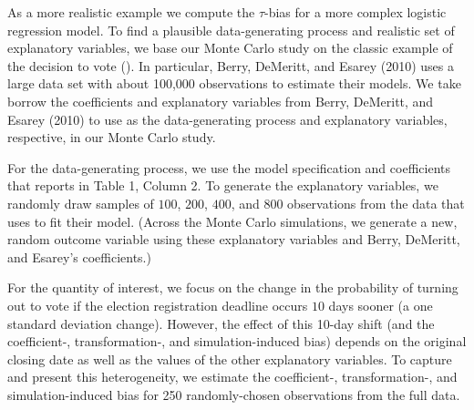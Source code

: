 \documentclass[11pt]{article}
\begin{document}
As a more realistic example we compute the $\tau$-bias for a more complex logistic regression model.
To find a plausible data-generating process and realistic set of explanatory variables, we base our Monte Carlo study on the classic example of the decision to vote (\citealt{WolfingerRosenstone1980, Nagler1994, HuangShields2000, BerryDeMerittEsarey2010}).
In particular, Berry, DeMeritt, and Esarey (2010) uses a large data set with about 100,000 observations to estimate their models.
We take borrow the coefficients and explanatory variables from Berry, DeMeritt, and Esarey (2010) to use as the data-generating process and explanatory variables, respective, in our Monte Carlo study.

For the data-generating process, we use the model specification and coefficients that \cite{BerryDeMerittEsarey2010} reports in Table 1, Column 2.
To generate the explanatory variables, we randomly draw samples of $100$, $200$, $400$, and $800$ observations from the data that \cite{BerryDeMerittEsarey2010} uses to fit their model.
(Across the Monte Carlo simulations, we generate a new, random outcome variable using these explanatory variables and Berry, DeMeritt, and Esarey's coefficients.)

For the quantity of interest, we focus on the change in the probability of turning out to vote if the election registration deadline occurs $10$ days sooner (a one standard deviation change).
However, the effect of this 10-day shift (and the coefficient-, transformation-, and simulation-induced bias) depends on the original closing date as well as the values of the other explanatory variables.
To capture and present this heterogeneity, we estimate the coefficient-, transformation-, and simulation-induced bias for 250 randomly-chosen observations from the full data.

\end{document}
